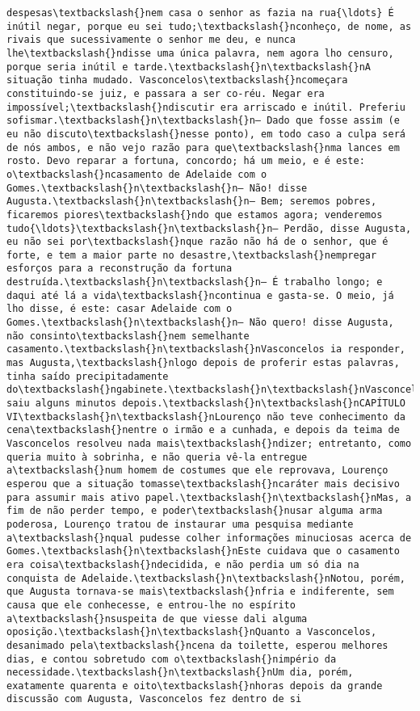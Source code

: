 \begin{Verbatim}[commandchars=\\\{\}]
despesas\textbackslash{}nem casa o senhor as fazia na rua{\ldots} É inútil negar, porque eu sei tudo;\textbackslash{}nconheço, de nome, as rivais que sucessivamente o senhor me deu, e nunca lhe\textbackslash{}ndisse uma única palavra, nem agora lho censuro, porque seria inútil e tarde.\textbackslash{}n\textbackslash{}nA situação tinha mudado. Vasconcelos\textbackslash{}ncomeçara constituindo-se juiz, e passara a ser co-réu. Negar era impossível;\textbackslash{}ndiscutir era arriscado e inútil. Preferiu sofismar.\textbackslash{}n\textbackslash{}n— Dado que fosse assim (e eu não discuto\textbackslash{}nesse ponto), em todo caso a culpa será de nós ambos, e não vejo razão para que\textbackslash{}nma lances em rosto. Devo reparar a fortuna, concordo; há um meio, e é este: o\textbackslash{}ncasamento de Adelaide com o Gomes.\textbackslash{}n\textbackslash{}n— Não! disse Augusta.\textbackslash{}n\textbackslash{}n— Bem; seremos pobres, ficaremos piores\textbackslash{}ndo que estamos agora; venderemos tudo{\ldots}\textbackslash{}n\textbackslash{}n— Perdão, disse Augusta, eu não sei por\textbackslash{}nque razão não há de o senhor, que é forte, e tem a maior parte no desastre,\textbackslash{}nempregar esforços para a reconstrução da fortuna destruída.\textbackslash{}n\textbackslash{}n— É trabalho longo; e daqui até lá a vida\textbackslash{}ncontinua e gasta-se. O meio, já lho disse, é este: casar Adelaide com o Gomes.\textbackslash{}n\textbackslash{}n— Não quero! disse Augusta, não consinto\textbackslash{}nem semelhante casamento.\textbackslash{}n\textbackslash{}nVasconcelos ia responder, mas Augusta,\textbackslash{}nlogo depois de proferir estas palavras, tinha saído precipitadamente do\textbackslash{}ngabinete.\textbackslash{}n\textbackslash{}nVasconcelos saiu alguns minutos depois.\textbackslash{}n\textbackslash{}nCAPÍTULO VI\textbackslash{}n\textbackslash{}nLourenço não teve conhecimento da cena\textbackslash{}nentre o irmão e a cunhada, e depois da teima de Vasconcelos resolveu nada mais\textbackslash{}ndizer; entretanto, como queria muito à sobrinha, e não queria vê-la entregue a\textbackslash{}num homem de costumes que ele reprovava, Lourenço esperou que a situação tomasse\textbackslash{}ncaráter mais decisivo para assumir mais ativo papel.\textbackslash{}n\textbackslash{}nMas, a fim de não perder tempo, e poder\textbackslash{}nusar alguma arma poderosa, Lourenço tratou de instaurar uma pesquisa mediante a\textbackslash{}nqual pudesse colher informações minuciosas acerca de Gomes.\textbackslash{}n\textbackslash{}nEste cuidava que o casamento era coisa\textbackslash{}ndecidida, e não perdia um só dia na conquista de Adelaide.\textbackslash{}n\textbackslash{}nNotou, porém, que Augusta tornava-se mais\textbackslash{}nfria e indiferente, sem causa que ele conhecesse, e entrou-lhe no espírito a\textbackslash{}nsuspeita de que viesse dali alguma oposição.\textbackslash{}n\textbackslash{}nQuanto a Vasconcelos, desanimado pela\textbackslash{}ncena da toilette, esperou melhores dias, e contou sobretudo com o\textbackslash{}nimpério da necessidade.\textbackslash{}n\textbackslash{}nUm dia, porém, exatamente quarenta e oito\textbackslash{}nhoras depois da grande discussão com Augusta, Vasconcelos fez dentro de si 
\end{Verbatim}
